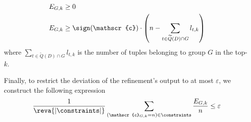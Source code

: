 \begin{align}
\begin{split}
E_{G, k} &\geq 0 \label{eq:tuples_to_satisfy_inline} \\
E_{G, k} &\geq \sign(\mathscr{c}) \cdot \left (n - \sum_{t \in \widetilde{Q}(D)\cap G} l_{t, k} \right)
\end{split}
\end{align}
where $\sum_{t \in \widetilde{Q}(D)\cap G} l_{t, k}$ is the number of tuples belonging to group $G$ in the top-$k$.

Finally, to restrict the deviation of the refinement's output to at most $\varepsilon$, we construct the following expression
\begin{align}
\frac{1}{\reva{|\constraints|}}\sum_{(\mathscr{c}_{G, k} = n) \in \constraints} \frac{E_{G, k}}{n} \leq \varepsilon \label{eq:max_deviation_inline}
\end{align}


